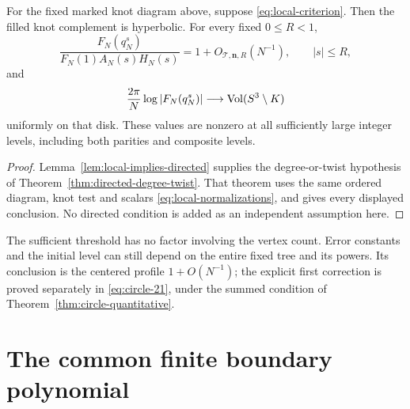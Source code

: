 \begin{corollary}
\label{thm:local-circle-volume}
For the fixed marked knot diagram above, suppose
\eqref{eq:local-criterion}. Then the filled knot complement
is hyperbolic. For every fixed \(0\le R<1\),
\begin{equation}\label{eq:local-profile}
 \frac{F_N(q_N^s)}{F_N(1)A_N(s)H_N(s)}
       =1+O_{\mathcal T,\mathbf n,R}(N^{-1}),\qquad |s|\le R,
\end{equation}
and
\begin{equation}\label{eq:local-volume}
 \frac{2\pi}{N}\log|F_N(q_N^s)|
          \longrightarrow\operatorname{Vol}(S^3\setminus K)
\end{equation}
uniformly on that disk. These values are nonzero at all sufficiently
large integer levels, including both parities and composite levels.
\end{corollary}
\begin{proof}
Lemma~\ref{lem:local-implies-directed} supplies the degree-or-twist
hypothesis of Theorem~\ref{thm:directed-degree-twist}. That theorem
uses the same ordered diagram, knot test and scalars
\eqref{eq:local-normalizations}, and gives every displayed conclusion.
No directed condition is added as an independent assumption here.
\end{proof}

The sufficient threshold has no factor involving the vertex count. Error constants and the
initial level can still depend on the entire fixed tree and its
powers. Its conclusion is the centered profile
\(1+O(N^{-1})\); the explicit first correction is proved separately in
\eqref{eq:circle-21}, under the summed condition of
Theorem~\ref{thm:circle-quantitative}.

\section{The common finite boundary polynomial}

